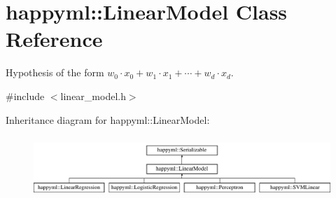 \hypertarget{classhappyml_1_1LinearModel}{}\section{happyml\+:\+:Linear\+Model Class Reference}
\label{classhappyml_1_1LinearModel}


Hypothesis of the form $w_0 \cdot x_0 + w_1 \cdot x_1 + \cdots + w_d \cdot x_d$.  




{\ttfamily \#include $<$linear\+\_\+model.\+h$>$}

Inheritance diagram for happyml\+:\+:Linear\+Model\+:\begin{figure}[H]
\begin{center}
\leavevmode
\includegraphics[height=2.346369cm]{classhappyml_1_1LinearModel}
\end{center}
\end{figure}
